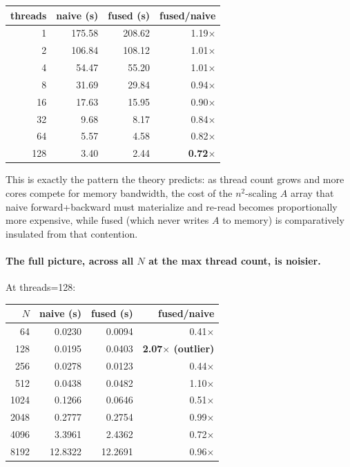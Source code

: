 \documentclass[11pt]{article}
\begin{document}
\begin{center}
\begin{tabular}{rrrr}
\toprule
threads & naive (s) & fused (s) & fused/naive \\
\midrule
1   & 175.58 & 208.62 & 1.19$\times$ \\
2   & 106.84 & 108.12 & 1.01$\times$ \\
4   & 54.47  & 55.20  & 1.01$\times$ \\
8   & 31.69  & 29.84  & 0.94$\times$ \\
16  & 17.63  & 15.95  & 0.90$\times$ \\
32  & 9.68   & 8.17   & 0.84$\times$ \\
64  & 5.57   & 4.58   & 0.82$\times$ \\
128 & 3.40   & 2.44   & \textbf{0.72$\times$} \\
\bottomrule
\end{tabular}
\end{center}

This is exactly the pattern the theory predicts: as thread count grows
and more cores compete for memory bandwidth, the cost of the
$n^2$-scaling $A$ array that naive forward+backward must materialize
and re-read becomes proportionally more expensive, while fused (which
never writes $A$ to memory) is comparatively insulated from that
contention.

\paragraph{The full picture, across all $N$ at the max thread count, is
noisier.} At threads=128:

\begin{center}
\begin{tabular}{rrrr}
\toprule
$N$ & naive (s) & fused (s) & fused/naive \\
\midrule
64   & 0.0230 & 0.0094 & 0.41$\times$ \\
128  & 0.0195 & 0.0403 & \textbf{2.07$\times$ (outlier)} \\
256  & 0.0278 & 0.0123 & 0.44$\times$ \\
512  & 0.0438 & 0.0482 & 1.10$\times$ \\
1024 & 0.1266 & 0.0646 & 0.51$\times$ \\
2048 & 0.2777 & 0.2754 & 0.99$\times$ \\
4096 & 3.3961 & 2.4362 & 0.72$\times$ \\
8192 & 12.8322 & 12.2691 & 0.96$\times$ \\
\bottomrule
\end{tabular}
\end{center}
\end{document}
